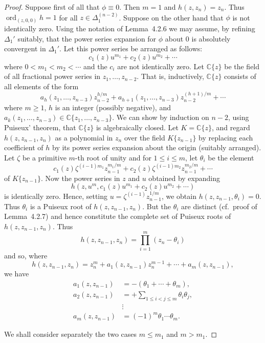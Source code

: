\documentclass[11pt]{article}
\theoremstyle{plain}
\theoremstyle{definition}
\newcommand{\C}{\mathbb{C}}
\DeclareMathOperator{\ord}{ord}
\begin{document}
\begin{proof}
Suppose first of all that $\phi \equiv 0$. Then $m = 1$ and
$h(z, z_n) = z_n$. Thus $\ord_{(z, 0, 0)} h = 1$ for all
$z \in \Delta_1^{(n-2)}$. Suppose on the other hand that $\phi$ is
not identically zero. Using the notation of Lemma~4.2.6 we may
assume, by refining $\Delta_1'$ suitably, that the power series
expansion for $\phi$ about $0$ is absolutely convergent in
$\Delta_1'$. Let this power series be arranged as follows:
\[
c_1(z) u^{m_1} + c_2(z) u^{m_2} + \cdots
\]
where $0 < m_1 < m_2 < \cdots$ and the $c_i$ are not identically
zero. Let $\C\{z\}$ be the field of all fractional power series in
$z_1, \ldots, z_{n-2}$. That is, inductively, $\C\{z\}$ consists of
all elements of the form
\[
a_h(z_1, \ldots, z_{n-3}) z_{n-2}^{h/m}
+ a_{h+1}(z_1, \ldots, z_{n-3}) z_{n-2}^{(h+1)/m} + \cdots
\]
where $m \ge 1$, $h$ is an integer (possibly negative), and
$a_k(z_1, \ldots, z_{n-3}) \in \C\{z_1, \ldots, z_{n-3}\}$. We can
show by induction on $n-2$, using Puiseux' theorem, that $\C\{z\}$
is algebraically closed. Let $K = \C\{z\}$, and regard
$h(z, z_{n-1}, z_n)$ as a polynomial in $z_n$ over the field
$K\{z_{n-1}\}$ by replacing each coefficient of $h$ by its power
series expansion about the origin (suitably arranged). Let $\zeta$
be a primitive $m$-th root of unity and for $1 \le i \le m$, let
$\theta_i$ be the element
\[
c_1(z) \zeta^{(i-1) m_1} z_{n-1}^{m_1/m}
+ c_2(z) \zeta^{(i-1) m_2} z_{n-1}^{m_2/m} + \cdots
\]
of $K\{z_{n-1}\}$. Now the power series in $z$ and $u$ obtained by
expanding
\[
h(z, u^m, c_1(z) u^{m_1} + c_2(z) u^{m_2} + \cdots)
\]
is identically zero. Hence, setting
$u = \zeta^{(i-1)} z_{n-1}^{1/m}$, we obtain
$h(z, z_{n-1}, \theta_i) = 0$. Thus $\theta_i$ is a Puiseux root of
$h(z, z_{n-1}, z_n)$. But the $\theta_i$ are distinct (cf.\ proof of
Lemma~4.2.7) and hence constitute the complete set of Puiseux roots
of $h(z, z_{n-1}, z_n)$. Thus
\[
h(z, z_{n-1}, z_n) = \prod_{i=1}^{m} (z_n - \theta_i)
\]
and so, where
\[
h(z, z_{n-1}, z_n) = z_n^m + a_1(z, z_{n-1}) z_n^{m-1}
+ \cdots + a_m(z, z_{n-1}),
\]
we have
\[
\begin{aligned}
a_1(z, z_{n-1}) &= -(\theta_1 + \cdots + \theta_m), \\
a_2(z, z_{n-1}) &= + \sum_{1 \le i < j \le m} \theta_i \theta_j, \\
&\vdots \\
a_m(z, z_{n-1}) &= (-1)^m \theta_1 \cdots \theta_m.
\end{aligned}
\]

We shall consider separately the two cases $m \le m_1$ and $m > m_1$.


\end{proof}
\end{document}
